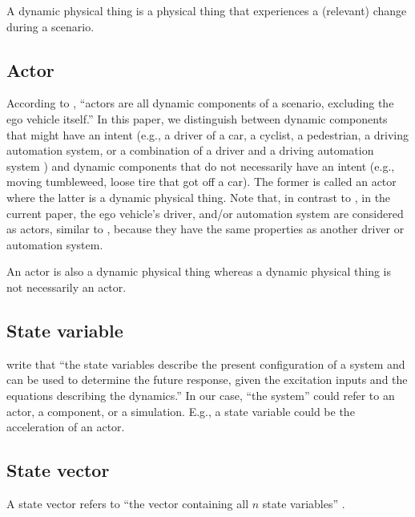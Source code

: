 A dynamic physical thing is a physical thing that experiences a (relevant) change during a scenario. 
\cendc



\subsection{Actor}
\label{sec:actor}

According to \textcite{catapult2018musicc}, ``actors are all dynamic components of a scenario, excluding the ego vehicle itself.'' \cstartc In this paper, we distinguish between dynamic components that might have an intent (e.g., a driver of a car, a cyclist, a pedestrian, a driving automation system, or a combination of a driver and a driving automation system \autocite{geyer2014}) and dynamic components that do not necessarily have an intent (e.g., moving tumbleweed, loose tire that got off a car). The former is called an actor where the latter is a dynamic physical thing. \cendc Note that, in contrast to \autocite{catapult2018musicc}, in the current paper, the ego vehicle's driver, and/or automation system are considered as actors, similar to \autocite{geyer2014},  because they have the same properties as another driver or automation system.

\cstartc
\begin{remark}
	An actor is also a dynamic physical thing whereas a dynamic physical thing is not necessarily an actor.
\end{remark}
\cendc

 
\subsection{State variable} 
\label{sec:state variable}
\textcite[p.~163]{dorf2011modern} write that ``the state variables describe the present configuration of a system and can be used to determine the future response, given the excitation inputs and the equations describing the dynamics.'' In our case, ``the system'' could refer to an actor, a component, or a simulation. E.g., a state variable could be the acceleration of an actor.

\subsection{State vector}
\label{sec:state vector}
A state vector refers to ``the vector containing all $n$ state variables'' \autocite[p.~233]{dorf2011modern}.

